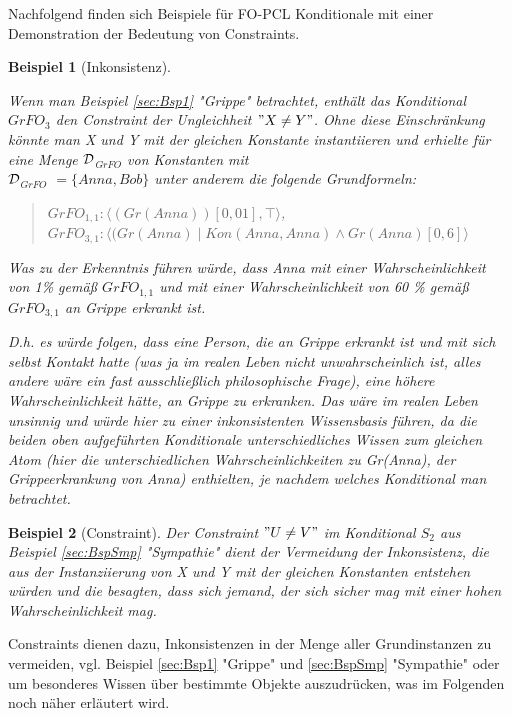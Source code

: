\documentclass[draft]{scrreprt}
\newtheorem{Bsp}{Beispiel}[section]
\begin{document}
Nachfolgend finden sich Beispiele für FO-PCL Konditionale mit einer Demonstration der Bedeutung von Constraints. 
\begin{Bsp}[Inkonsistenz]
\label{sec:Bsp}

Wenn man Beispiel \ref{sec:Bsp1} "{}Grippe"{} betrachtet, enthält das Konditional $ GrFO_{3}$ den Constraint der Ungleichheit $ "{} X \neq Y "{} $. Ohne diese Einschränkung könnte man X und Y mit der gleichen Konstante instantiieren und erhielte  für eine Menge $ \cal D $$_{GrFO} $ von Konstanten mit\\
 $ \cal D $$_{GrFO}  $ $ = \{Anna, Bob \} $ unter anderem die folgende Grundformeln:\\
 \begin{quote}
 	$ GrFO_{1, 1}  :  \langle (Gr(Anna))[0,01], \top \rangle $,\\
 	$ GrFO_{3, 1} : \langle (Gr(Anna) \mid Kon(Anna, Anna) \wedge Gr(Anna)[0,6]  \rangle$\\
 \end{quote}
  Was zu der Erkenntnis führen würde, dass Anna mit einer Wahrscheinlichkeit von 1\% gemäß  $ GrFO_{1, 1}  $ und mit einer Wahrscheinlichkeit von 60 \% gemäß $ GrFO_{3, 1}  $ an Grippe erkrankt ist. 
  
 D.h. es würde folgen, dass eine Person, die an Grippe erkrankt ist und mit sich selbst Kontakt hatte (was ja im realen Leben nicht unwahrscheinlich ist, alles andere wäre ein fast ausschließlich philosophische Frage), eine höhere Wahrscheinlichkeit hätte, an Grippe zu erkranken. Das wäre im realen Leben unsinnig und würde hier zu einer inkonsistenten Wissensbasis führen, da die beiden oben aufgeführten Konditionale unterschiedliches Wissen zum gleichen Atom (hier die unterschiedlichen Wahrscheinlichkeiten zu Gr(Anna), der Grippeerkrankung von Anna) enthielten, je nachdem welches Konditional man betrachtet. 



\end{Bsp}

\begin{Bsp}[Constraint]
\label{sec:BspConstraint}
Der Constraint $ "{} U \neq V "{} $ im Konditional $ S_{2} $ aus Beispiel \ref{sec:BspSmp} "{}Sympathie"{} dient der Vermeidung der Inkonsistenz, die aus der Instanziierung von X und Y mit der gleichen Konstanten entstehen würden und die besagten, dass sich jemand, der sich sicher mag mit einer hohen Wahrscheinlichkeit mag. 
\end{Bsp}
Constraints dienen dazu, Inkonsistenzen in der Menge aller Grundinstanzen zu vermeiden, vgl. Beispiel \ref{sec:Bsp1} "{}Grippe"{}  und \ref{sec:BspSmp} "{}Sympathie"{} oder um besonderes Wissen über bestimmte Objekte auszudrücken, was im Folgenden noch näher erläutert wird.
\end{document}
